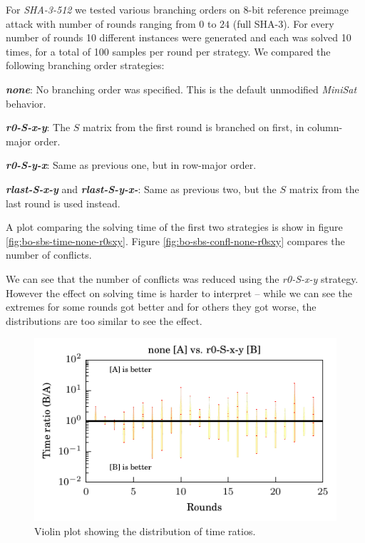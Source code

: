 For \emph{SHA-3-512} we tested various branching orders on $8$-bit reference preimage attack with number of rounds ranging from $0$ to $24$ (full SHA-3).
For every number of rounds 10 different instances were generated and each was solved 10 times, for a total of 100 samples per round per strategy.
We compared the following branching order strategies:

\textbf{\emph{none}}: No branching order was specified. This is the default unmodified \emph{MiniSat} behavior.

\textbf{\emph{r0-S-x-y}}: The $S$ matrix from the first round is branched on first, in column-major order.

\textbf{\emph{r0-S-y-x}}: Same as previous one, but in row-major order.

\textbf{\emph{rlast-S-x-y}} and \textbf{\emph{rlast-S-y-x-}}: Same as previous two, but the $S$ matrix from the last round is used instead.	

A plot comparing the solving time of the first two strategies is show in figure \ref{fig:bo-sbs-time-none-r0sxy}.
Figure \ref{fig:bo-sbs-confl-none-r0sxy} compares the number of conflicts.

We can see that the number of conflicts was reduced using the \emph{r0-S-x-y} strategy.
However the effect on solving time is harder to interpret -- while we can see the extremes for some rounds got better and for others they got worse, the distributions are too similar to see the effect.

\begin{figure}
\centering \includegraphics{figures/bo-ex1/ratio-time-none-r0sxy.pdf}
\caption{Violin plot showing the distribution of time ratios.}
\label{fig:bo-ratio-time-none-r0sxy}
\end{figure}

